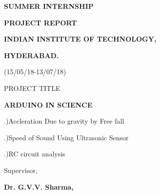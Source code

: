\documentclass[12pt]{article}
\begin{document}
\vspace{\baselineskip}

\vspace{\baselineskip}
{\fontsize{21.pt}{32.4pt}\selectfont \textbf{SUMMER INTERNSHIP }\par}\par
{\fontsize{21.pt}{32.4pt}\selectfont \textbf{ PROJECT REPORT   }\par}\par

\vspace{\baselineskip}
\vspace{\baselineskip}
{\fontsize{21pt}{25.2pt}\selectfont \textbf{INDIAN INSTITUTE OF TECHNOLOGY,} \par}\par
{\fontsize{21pt}{25.2pt}\selectfont \textbf{ HYDERABAD.}\par}\par

{\fontsize{21pt}{25.2pt}\selectfont (15/05/18-13/07/18)\par}\par


\vspace{\baselineskip}
{\fontsize{17pt}{20.4pt}\selectfont PROJECT TITLE\par}\par


\vspace{\baselineskip}
{\fontsize{20.74pt}{26.4pt}\selectfont \textbf{ARDUINO IN SCIENCE}\par}\par
{\fontsize{20.74pt}{26.4pt}.)Accleration Due to gravity by Free fall\par}\par
{\fontsize{20.74pt}{26.4pt}.)Speed of Sound Using Ultrasonic Sensor\par}\par
{\fontsize{20.74pt}{26.4pt}.)RC circuit analysis\par}\par


\vspace{\baselineskip}

\vspace{\baselineskip}
{\fontsize{17.28pt}{19.2pt}\selectfont Supervisor,\par}\par


\vspace{\baselineskip}
{\fontsize{24.88pt}{28.8pt}\selectfont \textbf{Dr. G.V.V. Sharma,}\par}\par
\end{document}
